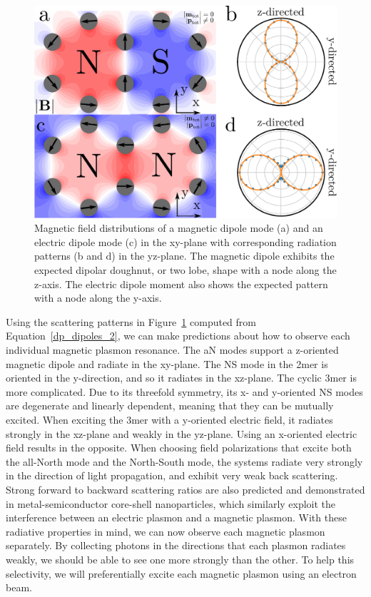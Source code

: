 \documentclass[journal=apchd5,manuscript=article]{achemso}
\begin{document}
\begin{figure}
\includegraphics[width=5in]{scattering_patterns.pdf}
\caption{Magnetic field distributions of a magnetic dipole mode (a) and an electric dipole mode (c) in the xy-plane with corresponding radiation patterns (b and d) in the yz-plane. The magnetic dipole exhibits the expected dipolar doughnut, or two lobe, shape with a node along the z-axis. The electric dipole moment also shows the expected pattern with a node along the y-axis.}
\label{scattering}
\end{figure}

Using the scattering patterns in Figure~\ref{scattering} computed from Equation~\ref{dp_dipoles_2}, we can make predictions about how to observe each individual magnetic plasmon resonance. The aN modes support a z-oriented magnetic dipole and radiate in the xy-plane. The NS mode in the 2mer is oriented in the y-direction, and so it radiates in the xz-plane. The cyclic 3mer is more complicated. Due to its threefold symmetry, its x- and y-oriented NS modes are degenerate and linearly dependent, meaning that they can be mutually excited. When exciting the 3mer with a y-oriented electric field, it radiates strongly in the xz-plane and weakly in the yz-plane. Using an x-oriented electric field results in the opposite. When choosing field polarizations that excite both the all-North mode and the North-South mode, the systems radiate very strongly in the direction of light propagation, and exhibit very weak back scattering. Strong forward to backward scattering ratios are also predicted and demonstrated in metal-semiconductor core-shell nanoparticles, which similarly exploit the interference between an electric plasmon and a magnetic plasmon\cite{Kivshar2012}. With these radiative properties in mind, we can now observe each magnetic plasmon separately. By collecting photons in the directions that each plasmon radiates weakly, we should be able to see one more strongly than the other. To help this selectivity, we will preferentially excite each magnetic plasmon using an electron beam.
\end{document}
